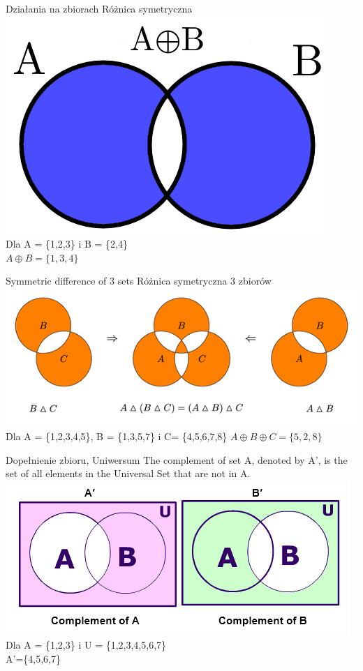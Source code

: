 \documentclass{beamer}
\begin{document}
\begin{frame}{Działania na zbiorach}
Różnica symetryczna
\includegraphics{różnica_symetryczna}\cite{niebezpieczna}\\
Dla A = \{1,2,3\} i B = \{2,4\} \\
$A\oplus B=\{1,3,4\}$
\end{frame}

\begin{frame}{Symmetric difference of 3 sets}
Różnica symetryczna 3 zbiorów
\includegraphics[scale=0.9]{symetryczna3}\cite{r3}\\
Dla A = \{1,2,3,4,5\}, B = \{1,3,5,7\}  i  C= \{4,5,6,7,8\}
$A\oplus B\oplus C=\{5,2,8\}$
\end{frame}

\begin{frame}{Dopełnienie zbioru, Uniwersum}
The complement of set A, denoted by A’, is the set of all elements in the Universal Set that are not in A.\\
\includegraphics[scale=0.8]{complement}\cite{U}\\
Dla A = \{1,2,3\} i U = \{1,2,3,4,5,6,7\} \\
A'=\{4,5,6,7\}
\end{frame}
\end{document}
